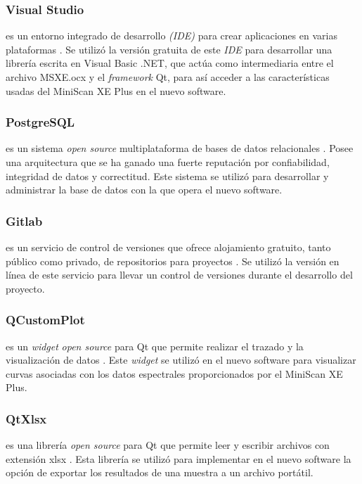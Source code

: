 \documentclass[conference]{IEEEtran}
\begin{document}
		\subsubsection{Visual Studio}
			es un entorno integrado de desarrollo \textit{(IDE)} para crear aplicaciones en varias plataformas \cite{VS}. Se utiliz\'{o} la versi\'{o}n gratuita de este \textit{IDE} para desarrollar una librer\'{i}a escrita en Visual Basic .NET, que act\'{u}a como intermediaria entre el archivo MSXE.ocx y el \textit{framework} Qt, para as\'{i} acceder a las caracter\'{i}sticas usadas del MiniScan XE Plus en el nuevo software.
			
		\subsubsection{PostgreSQL}
			es un sistema \textit{open source} multiplataforma de bases de datos relacionales \cite{PostgreSQL}. Posee una arquitectura que se ha ganado una fuerte reputaci\'{o}n por confiabilidad, integridad de datos y correctitud. Este sistema se utiliz\'{o} para desarrollar y administrar la base de datos con la que opera el nuevo software.
			
		\subsubsection{Gitlab}
			es un servicio de control de versiones que ofrece alojamiento gratuito, tanto p\'{u}blico como privado, de repositorios para proyectos \cite{Gitlab}. Se utiliz\'{o} la versi\'{o}n en l\'{i}nea de este servicio para llevar un control de versiones durante el desarrollo del proyecto.

		\subsubsection{QCustomPlot}
			es un \textit{widget} \textit{open source} para Qt que permite realizar el trazado y la visualizaci\'{o}n de datos \cite{QCustomPlot}. Este \textit{widget} se utiliz\'{o} en el nuevo software para visualizar curvas asociadas con los datos espectrales proporcionados por el MiniScan XE Plus.
			
		\subsubsection{QtXlsx}
		
			es una librer\'{i}a \textit{open source} para Qt que permite leer y escribir archivos con extensi\'{o}n xlsx \cite{Qtxlsx}. Esta librer\'{i}a se utiliz\'{o} para implementar en el nuevo software la opci\'{o}n de exportar los resultados de una muestra a un archivo port\'{a}til.
			
\end{document}
